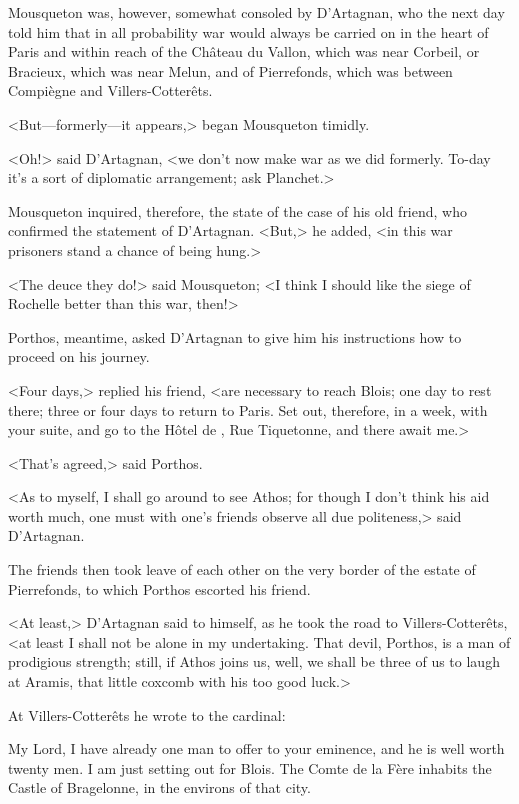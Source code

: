 Mousqueton was, however, somewhat consoled by D'Artagnan, who the next day told him that in all probability war would always be carried on in the heart of Paris and within reach of the Château du Vallon, which was near Corbeil, or Bracieux, which was near Melun, and of Pierrefonds, which was between Compiègne and Villers-Cotterêts.

<But—formerly—it appears,> began Mousqueton timidly.

<Oh!> said D'Artagnan, <we don't now make war as we did formerly. To-day it's a sort of diplomatic arrangement; ask Planchet.>

Mousqueton inquired, therefore, the state of the case of his old friend, who confirmed the statement of D'Artagnan. <But,> he added, <in this war prisoners stand a chance of being hung.>

<The deuce they do!> said Mousqueton; <I think I should like the siege of Rochelle better than this war, then!>

Porthos, meantime, asked D'Artagnan to give him his instructions how to proceed on his journey.

<Four days,> replied his friend, <are necessary to reach Blois; one day to rest there; three or four days to return to Paris. Set out, therefore, in a week, with your suite, and go to the Hôtel de , Rue Tiquetonne, and there await me.>

<That's agreed,> said Porthos.

<As to myself, I shall go around to see Athos; for though I don't think his aid worth much, one must with one's friends observe all due politeness,> said D'Artagnan.

The friends then took leave of each other on the very border of the estate of Pierrefonds, to which Porthos escorted his friend.

<At least,> D'Artagnan said to himself, as he took the road to Villers-Cotterêts, <at least I shall not be alone in my undertaking. That devil, Porthos, is a man of prodigious strength; still, if Athos joins us, well, we shall be three of us to laugh at Aramis, that little coxcomb with his too good luck.>

At Villers-Cotterêts he wrote to the cardinal:  
\begin{mail}{}{My Lord,}
I have already one man to offer to your eminence, and he is well worth twenty men. I am just setting out for Blois. The Comte de la Fère inhabits the Castle of Bragelonne, in the environs of that city.
\end{mail}